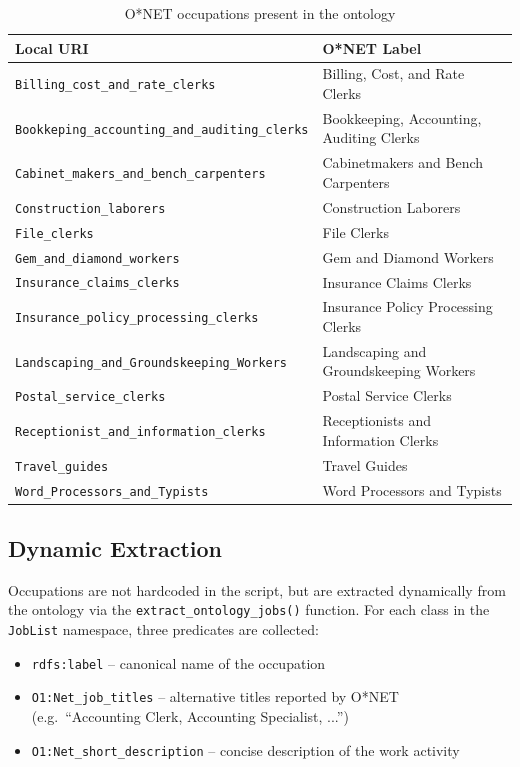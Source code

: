\documentclass[12pt, a4paper]{report}
\begin{document}
\begin{table}[H]
\centering
\begin{tabular}{ll}
\toprule
\textbf{Local URI} & \textbf{O*NET Label} \\
\midrule
\texttt{Billing\_cost\_and\_rate\_clerks} & Billing, Cost, and Rate Clerks \\
\texttt{Bookkeping\_accounting\_and\_auditing\_clerks} & Bookkeeping, Accounting, Auditing Clerks \\
\texttt{Cabinet\_makers\_and\_bench\_carpenters} & Cabinetmakers and Bench Carpenters \\
\texttt{Construction\_laborers} & Construction Laborers \\
\texttt{File\_clerks} & File Clerks \\
\texttt{Gem\_and\_diamond\_workers} & Gem and Diamond Workers \\
\texttt{Insurance\_claims\_clerks} & Insurance Claims Clerks \\
\texttt{Insurance\_policy\_processing\_clerks} & Insurance Policy Processing Clerks \\
\texttt{Landscaping\_and\_Groundskeeping\_Workers} & Landscaping and Groundskeeping Workers \\
\texttt{Postal\_service\_clerks} & Postal Service Clerks \\
\texttt{Receptionist\_and\_information\_clerks} & Receptionists and Information Clerks \\
\texttt{Travel\_guides} & Travel Guides \\
\texttt{Word\_Processors\_and\_Typists} & Word Processors and Typists \\
\bottomrule
\end{tabular}
\caption{O*NET occupations present in the ontology}
\end{table}

\subsection{Dynamic Extraction}

Occupations are not hardcoded in the script, but are extracted
dynamically from the ontology via the
\texttt{extract\_ontology\_jobs()} function. For each class in the
\texttt{JobList} namespace, three predicates are collected:

\begin{itemize}
  \item \texttt{rdfs:label} -- canonical name of the occupation
  \item \texttt{O1:Net\_job\_titles} -- alternative titles reported
        by O*NET (e.g.\ ``Accounting Clerk, Accounting Specialist, ...'')
  \item \texttt{O1:Net\_short\_description} -- concise description
        of the work activity
\end{itemize}
\end{document}
